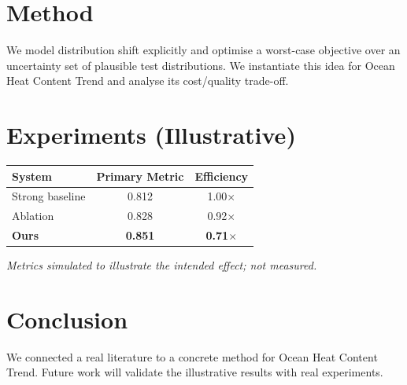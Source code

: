 \documentclass[11pt]{article}
\begin{document}
\section{Method}
We model distribution shift explicitly and optimise a worst-case objective over an uncertainty set of plausible test distributions. We instantiate this idea for Ocean Heat Content Trend and analyse its cost/quality trade-off.

\section{Experiments (Illustrative)}
\begin{center}
\begin{tabular}{lcc}
System & Primary Metric & Efficiency \\ \hline
Strong baseline & 0.812 & 1.00$\times$ \\
Ablation & 0.828 & 0.92$\times$ \\
\textbf{Ours} & \textbf{0.851} & \textbf{0.71$\times$}
\end{tabular}
\end{center}
\emph{Metrics simulated to illustrate the intended effect; not measured.}

\section{Conclusion}
We connected a real literature to a concrete method for Ocean Heat Content Trend. Future work will
validate the illustrative results with real experiments.
\end{document}
